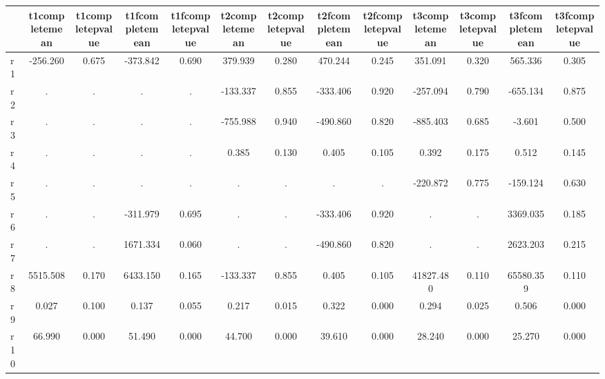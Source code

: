 \begin{table}[htbp]
\begin{tabular}{lcccccccccccc} \hline \hline
 & t1completemean  & t1completepvalue  & t1fcompletemean  & t1fcompletepvalue  & t2completemean  & t2completepvalue  & t2fcompletemean  & t2fcompletepvalue  & t3completemean  & t3completepvalue  & t3fcompletemean  & t3fcompletepvalue  \\  \hline 
r1 &  -256.260 &     0.675 &  -373.842 &     0.690 &   379.939 &     0.280 &   470.244 &     0.245 &   351.091 &     0.320 &   565.336 &     0.305 \\  
r2 &         . &         . &         . &         . &  -133.337 &     0.855 &  -333.406 &     0.920 &  -257.094 &     0.790 &  -655.134 &     0.875 \\  
r3 &         . &         . &         . &         . &  -755.988 &     0.940 &  -490.860 &     0.820 &  -885.403 &     0.685 &    -3.601 &     0.500 \\  
r4 &         . &         . &         . &         . &     0.385 &     0.130 &     0.405 &     0.105 &     0.392 &     0.175 &     0.512 &     0.145 \\  
r5 &         . &         . &         . &         . &         . &         . &         . &         . &  -220.872 &     0.775 &  -159.124 &     0.630 \\  
r6 &         . &         . &  -311.979 &     0.695 &         . &         . &  -333.406 &     0.920 &         . &         . &  3369.035 &     0.185 \\  
r7 &         . &         . &  1671.334 &     0.060 &         . &         . &  -490.860 &     0.820 &         . &         . &  2623.203 &     0.215 \\  
r8 &  5515.508 &     0.170 &  6433.150 &     0.165 &  -133.337 &     0.855 &     0.405 &     0.105 & 41827.480 &     0.110 & 65580.359 &     0.110 \\  
r9 &     0.027 &     0.100 &     0.137 &     0.055 &     0.217 &     0.015 &     0.322 &     0.000 &     0.294 &     0.025 &     0.506 &     0.000 \\  
r10 &    66.990 &     0.000 &    51.490 &     0.000 &    44.700 &     0.000 &    39.610 &     0.000 &    28.240 &     0.000 &    25.270 &     0.000 \\  
\hline \hline \end{tabular}
\end{table}
